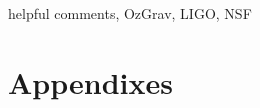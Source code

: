 \documentclass[%
 reprint,
 amsmath,amssymb,
 aps,
]{revtex4-2}
\begin{document}
\begin{acknowledgments}
helpful comments, OzGrav, LIGO, NSF

\end{acknowledgments}

\appendix
\section{Appendixes}


\end{document}

